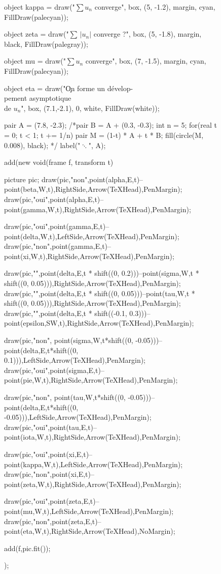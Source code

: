\begin{landscape}
\begin{figure}[H]
\begin{asy}
			object kappa = draw("$\sum u_n$ converge", box, (5, -1.2), margin, cyan, FillDraw(palecyan));

			object zeta = draw("$\sum\,|u_n|$ converge ?", box, (5, -1.8), margin, black, FillDraw(palegray));

			object mu = draw("$\sum u_n$ converge", box, (7, -1.5), margin, cyan, FillDraw(palecyan));

			object eta = draw("\c{On forme un dévelop-\\pement asymptotique\\ de $u_n$}", box, (7.1,-2.1), 0, white, FillDraw(white));

			pair A = (7.8, -2.3);
			/*pair B = A + (0.3, -0.3);
			int n = 5;
			for(real t = 0; t < 1; t += 1/n) {
				pair M = (1-t) * A + t * B;
				fill(circle(M, 0.008), black);
			}*/
			label("$\ddots$", A);


			add(new void(frame f, transform t) {
					picture pic;
					draw(pic,"\sc non",point(alpha,E,t)--point(beta,W,t),RightSide,Arrow(TeXHead),PenMargin);
					draw(pic,"\sc oui",point(alpha,E,t)--point(gamma,W,t),RightSide,Arrow(TeXHead),PenMargin);

					draw(pic,"\sc oui",point(gamma,E,t)--point(delta,W,t),LeftSide,Arrow(TeXHead),PenMargin);
					draw(pic,"\sc non",point(gamma,E,t)--point(xi,W,t),RightSide,Arrow(TeXHead),PenMargin);

					draw(pic,"",point(delta,E,t * shift((0, 0.2)))--point(sigma,W,t * shift((0, 0.05))),RightSide,Arrow(TeXHead),PenMargin);
					draw(pic,"",point(delta,E,t * shift((0, 0.05)))--point(tau,W,t * shift((0, 0.05))),RightSide,Arrow(TeXHead),PenMargin);
					draw(pic,"",point(delta,E,t * shift((-0.1, 0.3)))--point(epsilon,SW,t),RightSide,Arrow(TeXHead),PenMargin);

					draw(pic,"\sc non", point(sigma,W,t*shift((0, -0.05)))--point(delta,E,t*shift((0, 0.1))),LeftSide,Arrow(TeXHead),PenMargin);
					draw(pic,"\sc oui",point(sigma,E,t)--point(pie,W,t),RightSide,Arrow(TeXHead),PenMargin);


					draw(pic,"\sc non", point(tau,W,t*shift((0, -0.05)))--point(delta,E,t*shift((0, -0.05))),LeftSide,Arrow(TeXHead),PenMargin);
					draw(pic,"\sc oui",point(tau,E,t)--point(iota,W,t),RightSide,Arrow(TeXHead),PenMargin);

					draw(pic,"\sc oui",point(xi,E,t)--point(kappa,W,t),LeftSide,Arrow(TeXHead),PenMargin);
					draw(pic,"\sc non",point(xi,E,t)--point(zeta,W,t),RightSide,Arrow(TeXHead),PenMargin);

					draw(pic,"\sc oui",point(zeta,E,t)--point(mu,W,t),LeftSide,Arrow(TeXHead),PenMargin);
					draw(pic,"\sc non",point(zeta,E,t)--point(eta,W,t),RightSide,Arrow(TeXHead),NoMargin);

					add(f,pic.fit());
				});
		\end{asy}
	\end{figure}
\end{landscape}

